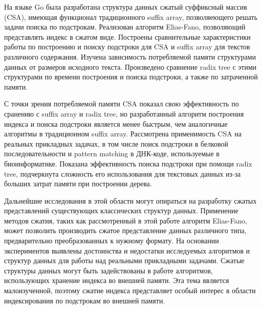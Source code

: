 
На языке Go была разработана структура данных сжатый суффиксный массив (CSA), имеющая
функционал традиционного suffix array, позволяеющего решать задачи поиска по подстрокам.
Реализован алгоритм Elias-Fano, позволяющий представлять индекс в сжатом виде.
Построены сравнительные характеристики работы по построению и поиску подстроки
для CSA и suffix array для текстов различного содержания.
Изучена зависимость потребляемой памяти структурами данных от размеров исходного текста.
Произведено сравнение radix tree с этими структурами по времени построения и поиска подстроки,
а также по затраченной памяти.

С точки зрения потребляемой памяти CSA показал свою эффективность по сранению с suffix array и radix tree,
но разработанный алгоритм построения индекса и поиска подстроки является менее быстрым,
чем аналогичные алгоритмы в традиционном suffix array. Рассмотрена применимость CSA на реальных
прикладных задачах, в том числе поиск подстроки в белковой последовательности
и pattern matching в ДНК-коде, используемые в биоинформатике.
Показана эффективность поиска подстроки при помощи radix tree,
подчеркнута сложность его использования для текстовых данных из-за больших
затрат памяти при построении дерева.

Дальнейшие исследования в этой области могут опираться на разработку сжатых представлений существующих
классических структур данных. Применение методов сжатия,
таких как рассмотренный в этой работе алгоритм Elias-Fano, может позволить производить сжатое представление
данных различного типа, предварительно преобразованных к нужному формату.
На основании экспериментов выявлены достоинства и недостатки исследуемых алгоритмов и структур данных
для работы над реальными прикладными задачами.
Сжатые структуры данных могут быть задействованы в работе алгоритмов,
использующих хранение индекса во внешней памяти. Эта тема является малоизученной, поэтому
сжатие индекса представляет особый интерес в области индексирования по подстрокам во внешней памяти.

